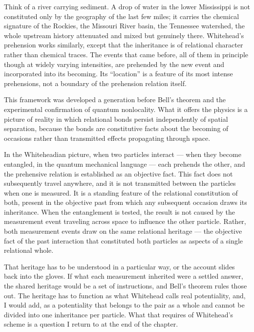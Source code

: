 Think of a river carrying sediment. A drop of water in the lower Mississippi is not constituted only by the geography of the last few miles; it carries the chemical signature of the Rockies, the Missouri River basin, the Tennessee watershed, the whole upstream history attenuated and mixed but genuinely there. Whitehead's prehension works similarly, except that the inheritance is of relational character rather than chemical traces. The events that came before, all of them in principle though at widely varying intensities, are prehended by the new event and incorporated into its becoming. Its ``location'' is a feature of its most intense prehensions, not a boundary of the prehension relation itself.

This framework was developed a generation before Bell's theorem and the experimental confirmation of quantum nonlocality. What it offers the physics is a picture of reality in which relational bonds persist independently of spatial separation, because the bonds are constitutive facts about the becoming of occasions rather than transmitted effects propagating through space.

In the Whiteheadian picture, when two particles interact --- when they become entangled, in the quantum mechanical language --- each prehends the other, and the prehensive relation is established as an objective fact. This fact does not subsequently travel anywhere, and it is not transmitted between the particles when one is measured. It is a standing feature of the relational constitution of both, present in the objective past from which any subsequent occasion draws its inheritance. When the entanglement is tested, the result is not caused by the measurement event traveling across space to influence the other particle. Rather, both measurement events draw on the same relational heritage --- the objective fact of the past interaction that constituted both particles as aspects of a single relational whole.

That heritage has to be understood in a particular way, or the account slides back into the gloves. If what each measurement inherited were a settled answer, the shared heritage would be a set of instructions, and Bell's theorem rules those out. The heritage has to function as what Whitehead calls real potentiality, and, I would add, as a potentiality that belongs to the pair as a whole and cannot be divided into one inheritance per particle. What that requires of Whitehead's scheme is a question I return to at the end of the chapter.


